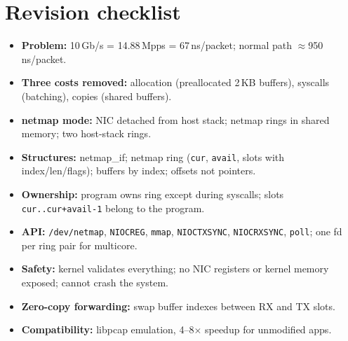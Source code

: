 \section{Revision checklist}
\begin{itemize}
\item \textbf{Problem:} 10\,Gb/s = 14.88\,Mpps = 67\,ns/packet; normal path $\approx$950\,ns/packet.
\item \textbf{Three costs removed:} allocation (preallocated 2\,KB buffers), syscalls (batching), copies (shared buffers).
\item \textbf{netmap mode:} NIC detached from host stack; netmap rings in shared memory; two host-stack rings.
\item \textbf{Structures:} netmap\_if; netmap ring (\texttt{cur}, \texttt{avail}, slots with index/len/flags); buffers by index; offsets not pointers.
\item \textbf{Ownership:} program owns ring except during syscalls; slots \texttt{cur..cur+avail-1} belong to the program.
\item \textbf{API:} \texttt{/dev/netmap}, \texttt{NIOCREG}, \texttt{mmap}, \texttt{NIOCTXSYNC}, \texttt{NIOCRXSYNC}, \texttt{poll}; one fd per ring pair for multicore.
\item \textbf{Safety:} kernel validates everything; no NIC registers or kernel memory exposed; cannot crash the system.
\item \textbf{Zero-copy forwarding:} swap buffer indexes between RX and TX slots.
\item \textbf{Compatibility:} libpcap emulation, 4--8$\times$ speedup for unmodified apps.
\end{itemize}
